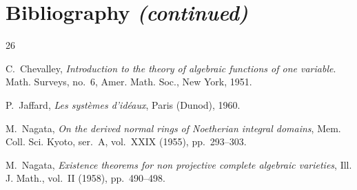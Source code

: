 \clearpage
{}
{}
\section*{Bibliography \textit{(continued)}}

\begin{thebibliography}{26}

C.~Chevalley,
\emph{Introduction to the theory of algebraic functions of one variable}.
Math. Surveys, no.~6, Amer. Math. Soc., New York, 1951.

P.~Jaffard,
\emph{Les systèmes d'idéaux}, Paris (Dunod), 1960.

M.~Nagata,
\emph{On the derived normal rings of Noetherian integral domains},
Mem. Coll. Sci. Kyoto, ser.~A, vol.~XXIX (1955), pp.~293--303.

M.~Nagata,
\emph{Existence theorems for non projective complete algebraic varieties},
Ill. J. Math., vol.~II (1958), pp.~490--498.

\end{thebibliography}

